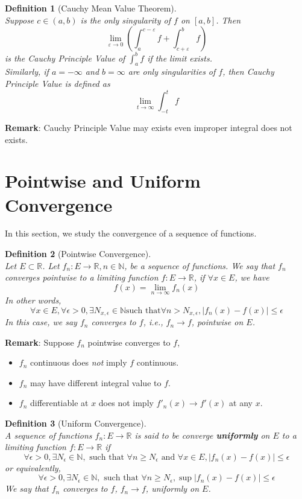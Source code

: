 \documentclass[12pt]{article}
\newtheorem{definition}{Definition}[section]
\theoremstyle{definition}
\begin{document}
\begin{definition}[Cauchy Mean Value Theorem]
\hfill\\\normalfont Suppose $c\in(a,b)$ is the only singularity of $f$ on $[a,b]$. Then
\[
\lim_{\varepsilon\to 0}(\int_a^{c-\varepsilon}f+\int_{c+\varepsilon}^b f)
\]
is the Cauchy Principle Value of $\int_a^b f$ if the limit exists.\\
Similarly, if $a=-\infty$ and $b=\infty$ are only singularities of $f$, then Cauchy Principle Value is defined as
\[
\lim_{t\to\infty}\int_{-t}^t f
\]
\end{definition}
\textbf{Remark}: Cauchy Principle Value may exists even improper integral does not exists.
\clearpage
\section{Pointwise and Uniform Convergence}
In this section, we study the convergence of a sequence of functions.
\begin{definition}[Pointwise Convergence]
\hfill\\\normalfont Let $E\subset\mathbb{R}$. Let $f_n:E\to\mathbb{R}, n\in\mathbb{N}$, be a sequence of functions. We say that $f_n$ converges pointwise to a limiting function $f:E\to\mathbb{R}$, if $\forall x\in E$, we have
\[
f(x)=\lim_{n\to\infty}f_n(x)
\]
In other words,
\[
\forall x\in E, \forall \epsilon>0, \exists N_{x,\epsilon}\in\mathbb{N} \text{such that} \forall n>N_{x,\epsilon}, |f_n(x)-f(x)|\leq \epsilon
\]
In this case, we say $f_n$ converges to $f$, i.e., $f_n\to f$, pointwise on $E$.
\end{definition}
\textbf{Remark}: Suppose $f_n$ pointwise converges to $f$, 
\begin{itemize}
	\item $f_n$ continuous does \textit{not} imply $f$ continuous.
	\item $f_n$ may have different integral value to $f$.
	\item $f_n$ differentiable at $x$ does not imply $f'_n(x)\to f'(x)$ at any $x$.
\end{itemize}
\begin{definition}[Uniform Convergence]
\hfill\\\normalfont A sequence of functions $f_n:E\to\mathbb{R}$ is said to be converge \textbf{uniformly} on $E$ to a limiting function $f:E\to\mathbb{R}$ if
\[
\forall \epsilon>0, \exists N_\epsilon\in\mathbb{N}, \text{ such that }\forall n\geq N_\epsilon \text{ and }\forall x\in E, |f_n(x)-f(x)|\leq \epsilon
\]
or equivalently,
\[
\forall \epsilon>0, \exists N_\epsilon\in\mathbb{N}, \text{ such that }\forall n\geq N_\epsilon, \sup|f_n(x)-f(x)|\leq \epsilon
\]
We say that $f_n$ converges to $f$, $f_n\to f$, uniformly on $E$.
\end{definition}
\end{document}
